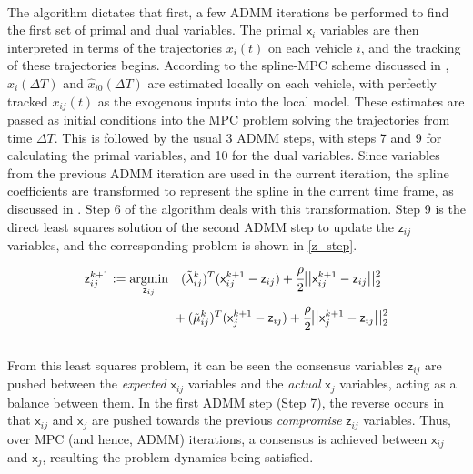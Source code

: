 \documentclass[letterpaper, 10 pt, conference]{ieeeconf}
\DeclareMathOperator*{\argmin}{argmin}
\newcommand{\cx}{\textsf{x}}
\newcommand{\cz}{\textsf{z}}
\begin{document}
\\
\indent
The algorithm dictates that first, a few ADMM iterations be performed to find the first set of primal and dual variables. The primal $\cx_{i}$ variables are then interpreted in terms of the trajectories $x_i(t)$ on each vehicle $i$, and the tracking of these trajectories begins. According to the spline-MPC scheme discussed in \cite{c16}, $\hat{x}_i(\Delta T)$ and $\hat{x}_{i0}(\Delta T)$ are estimated locally on each vehicle, with perfectly tracked $x_{ij}(t)$ as the exogenous inputs into the local model. These estimates are passed as initial conditions into the MPC problem solving the trajectories from time $\Delta T$. This is followed by the usual 3 ADMM steps, with steps 7 and 9 for calculating the primal variables, and 10 for the dual variables. Since variables from the previous ADMM iteration are used in the current iteration, the spline coefficients are transformed to represent the spline in the current time frame, as discussed in \cite{c16}. Step 6 of the algorithm deals with this transformation. Step 9 is the direct least squares solution of the second ADMM step to update the $\cz_{ij}$ variables, and the corresponding problem is shown in \eqref{z_step}.
\begin{equation}
\label{z_step}
\begin{aligned} \cz_{ij}^{k+1} &:=
 \argmin_{\cz_{ij}} \quad (\tilde{\lambda}^k_{ij})^T(\cx^{k+1}_{ij} - \cz_{ij}) + \cfrac{\rho}{2} \mathlarger{||}\cx^{k+1}_{ij} - \cz_{ij}\mathlarger{||}_2^2{{}} \\ & \qquad \quad \quad \quad
+ (\tilde{\mu}^k_{ij})^T(\cx^{k+1}_{j} - \cz_{ij}) +
\cfrac{\rho}{2} \mathlarger{||}\cx^{k+1}_{j} - \cz_{ij}\mathlarger{||}_2^2 \mathlarger{}
\end{aligned}
\end{equation}
\\
\indent
From this least squares problem, it can be seen the consensus variables $\cz_{ij}$ are pushed between the \textit{expected} $\cx_{ij}$ variables and the \textit{actual} $\cx_j$ variables, acting as a balance between them. In the first ADMM step (Step 7), the reverse occurs in that $\cx_{ij}$ and $\cx_j$ are pushed towards the previous \textit{compromise} $\cz_{ij}$ variables. Thus, over MPC (and hence, ADMM) iterations, a consensus is achieved between $\cx_{ij}$ and $\cx_j$, resulting the problem dynamics being satisfied.
\end{document}
